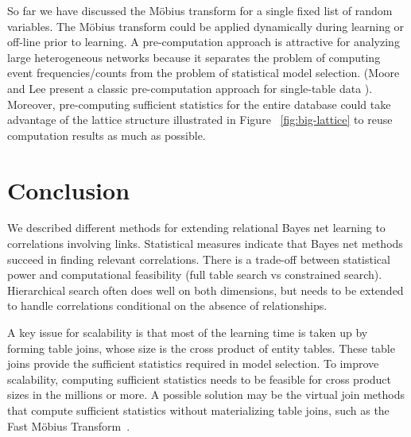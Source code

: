 \documentclass{article}
\begin{document}
%

So far we have discussed the M\"obius transform for a single fixed list of random variables. The M\"obius transform could be applied dynamically during learning or off-line prior to learning. A pre-computation approach is attractive for analyzing large heterogeneous networks because it separates the problem of computing event frequencies/counts from the problem of statistical model selection. (Moore and Lee present a classic pre-computation approach for single-table data \cite{Moore1998}). Moreover, pre-computing sufficient statistics for the entire database could take advantage of the lattice structure illustrated in Figure ~\ref{fig:big-lattice} to reuse computation results as much as possible.


\section{Conclusion} We described different methods for extending relational Bayes net learning to correlations involving links. 
Statistical measures indicate that Bayes net methods succeed in finding relevant correlations. 
There is a trade-off between statistical power and computational feasibility (full table search vs constrained search). 
Hierarchical search often does well on both dimensions, but needs to be extended to handle correlations conditional on the absence of relationships.

A key issue for scalability is that most of the learning time is taken up by forming table joins, whose size is the cross product of entity tables. 
These table joins provide the sufficient statistics required in model selection. 
To improve scalability, computing sufficient statistics needs to be feasible for cross product sizes in the millions or more. 
A possible solution may be the virtual join methods that compute sufficient statistics without materializing table joins, such as the Fast M\"obius Transform~\cite{Schulte2012b,Yin2004}.





\end{document}
